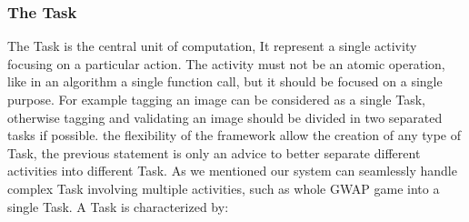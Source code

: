 \subsubsection{The Task}
The Task is the central unit of computation, It represent a single activity
focusing on a particular action. The activity must not be an atomic operation,
like in an algorithm a single function call, but it should be focused on a
single purpose. For example tagging an image can be considered as a single Task,
otherwise tagging and validating an image should be divided in two separated
tasks if possible. the flexibility of the framework allow the creation of any
type of Task, the previous statement is only an advice to better separate
different activities into different Task. As we mentioned our system can
seamlessly handle complex Task involving multiple activities, such as whole
\ac{GWAP} game into a single Task. A Task is characterized by:

